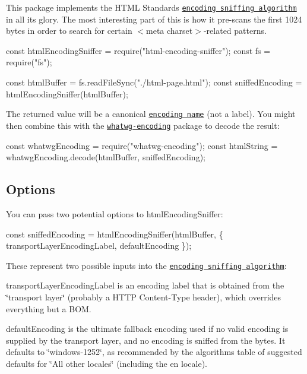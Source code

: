 This package implements the H\+T\+ML Standard\textquotesingle{}s \href{https://html.spec.whatwg.org/multipage/syntax.html#encoding-sniffing-algorithm}{\tt encoding sniffing algorithm} in all its glory. The most interesting part of this is how it pre-\/scans the first 1024 bytes in order to search for certain {\ttfamily $<$meta charset$>$}-\/related patterns.


\begin{DoxyCode}
const htmlEncodingSniffer = require("html-encoding-sniffer");
const fs = require("fs");

const htmlBuffer = fs.readFileSync("./html-page.html");
const sniffedEncoding = htmlEncodingSniffer(htmlBuffer);
\end{DoxyCode}


The returned value will be a canonical \href{https://encoding.spec.whatwg.org/#names-and-labels}{\tt encoding name} (not a label). You might then combine this with the \href{https://github.com/jsdom/whatwg-encoding}{\tt whatwg-\/encoding} package to decode the result\+:


\begin{DoxyCode}
const whatwgEncoding = require("whatwg-encoding");
const htmlString = whatwgEncoding.decode(htmlBuffer, sniffedEncoding);
\end{DoxyCode}


\subsection*{Options}

You can pass two potential options to {\ttfamily html\+Encoding\+Sniffer}\+:


\begin{DoxyCode}
const sniffedEncoding = htmlEncodingSniffer(htmlBuffer, \{
  transportLayerEncodingLabel,
  defaultEncoding
\});
\end{DoxyCode}


These represent two possible inputs into the \href{https://html.spec.whatwg.org/multipage/syntax.html#encoding-sniffing-algorithm}{\tt encoding sniffing algorithm}\+:


\begin{DoxyItemize}
\item {\ttfamily transport\+Layer\+Encoding\+Label} is an encoding label that is obtained from the \char`\"{}transport layer\char`\"{} (probably a H\+T\+TP {\ttfamily Content-\/\+Type} header), which overrides everything but a B\+OM.
\item {\ttfamily default\+Encoding} is the ultimate fallback encoding used if no valid encoding is supplied by the transport layer, and no encoding is sniffed from the bytes. It defaults to {\ttfamily \char`\"{}windows-\/1252\char`\"{}}, as recommended by the algorithm\textquotesingle{}s table of suggested defaults for \char`\"{}\+All other locales\char`\"{} (including the {\ttfamily en} locale).
\end{DoxyItemize}

